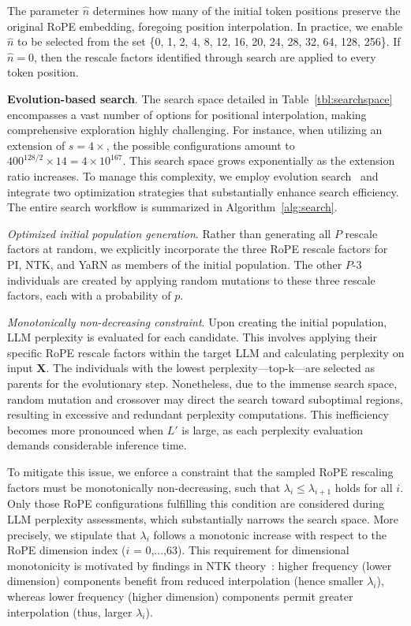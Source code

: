 The parameter $\hat{n}$ determines how many of the initial token positions preserve the original RoPE embedding, foregoing position interpolation. In practice, we enable $\hat{n}$ to be selected from the set \{0, 1, 2, 4, 8, 12, 16, 20, 24, 28, 32, 64, 128, 256\}. If $\hat{n}=0$, then the rescale factors identified through search are applied to every token position.

\textbf{Evolution-based search}. The search space detailed in Table~\ref{tbl:searchspace} encompasses a vast number of options for positional interpolation, making comprehensive exploration highly challenging. For instance, when utilizing an extension of $s=4\times$, the possible configurations amount to $400^{128/2}\times14=4\times10^{167}$. This search space grows exponentially as the extension ratio increases. To manage this complexity, we employ evolution search~\cite{guo2020single} and integrate two optimization strategies that substantially enhance search efficiency. The entire search workflow is summarized in Algorithm~\ref{alg:search}.

\textit{Optimized initial population generation}. Rather than generating all $P$ rescale factors at random, we explicitly incorporate the three RoPE rescale factors for PI, NTK, and YaRN as members of the initial population. The other $P$-3 individuals are created by applying random mutations to these three rescale factors, each with a probability of $p$.

\textit{Monotonically non-decreasing constraint}. Upon creating the initial population, LLM perplexity is evaluated for each candidate. This involves applying their specific RoPE rescale factors within the target LLM and calculating perplexity on input $\mathbf{X}$. The individuals with the lowest perplexity—top-k—are selected as parents for the evolutionary step. Nonetheless, due to the immense search space, random mutation and crossover may direct the search toward suboptimal regions, resulting in excessive and redundant perplexity computations. This inefficiency becomes more pronounced when $L'$ is large, as each perplexity evaluation demands considerable inference time.

To mitigate this issue, we enforce a constraint that the sampled RoPE rescaling factors must be monotonically non-decreasing, such that $\lambda_i\le \lambda_{i+1}$ holds for all $i$. Only those RoPE configurations fulfilling this condition are considered during LLM perplexity assessments, which substantially narrows the search space. More precisely, we stipulate that $\lambda_i$ follows a monotonic increase with respect to the RoPE dimension index ($i$ = 0,...,63). This requirement for dimensional monotonicity is motivated by findings in NTK theory~\cite{jacot2018neural,tancik2020fourier,ntk}: higher frequency (lower dimension) components benefit from reduced interpolation (hence smaller $\lambda_i$), whereas lower frequency (higher dimension) components permit greater interpolation (thus, larger $\lambda_i$).

